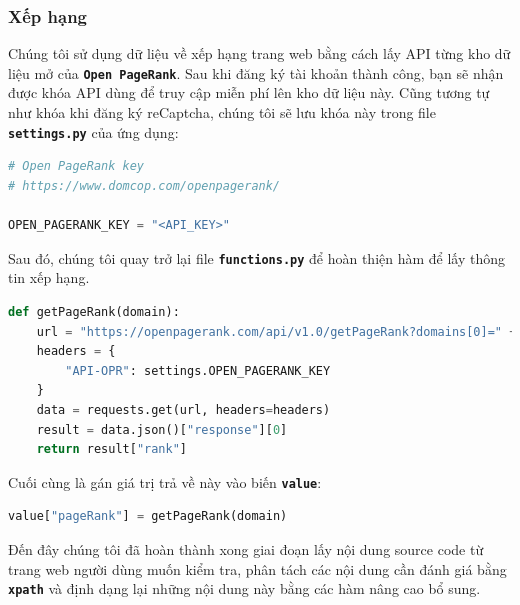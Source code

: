 \subsubsection{Xếp hạng}
Chúng tôi sử dụng dữ liệu về xếp hạng trang web bằng cách lấy API từng kho dữ liệu mở của \textbf{\texttt{Open PageRank}}. Sau khi đăng ký tài khoản thành công, bạn sẽ nhận được khóa API dùng để truy cập miễn phí lên kho dữ liệu này. Cũng tương tự như khóa khi đăng ký reCaptcha, chúng tôi sẽ lưu khóa này trong file \textbf{\texttt{settings.py}} của ứng dụng:
\begin{lstlisting}[language=Python]
# Open PageRank key
# https://www.domcop.com/openpagerank/

OPEN_PAGERANK_KEY = "<API_KEY>"
\end{lstlisting}
\par
Sau đó, chúng tôi quay trở lại file \textbf{\texttt{functions.py}} để hoàn thiện hàm để lấy thông tin xếp hạng.
\begin{lstlisting}[language=Python]
def getPageRank(domain):
    url = "https://openpagerank.com/api/v1.0/getPageRank?domains[0]=" + domain
    headers = {
        "API-OPR": settings.OPEN_PAGERANK_KEY
    }
    data = requests.get(url, headers=headers)
    result = data.json()["response"][0]
    return result["rank"]
\end{lstlisting}
\par
Cuối cùng là gán giá trị trả về này vào biến \textbf{\texttt{value}}:
\begin{lstlisting}[language=Python]
value["pageRank"] = getPageRank(domain)
\end{lstlisting}
\par
Đến đây chúng tôi đã hoàn thành xong giai đoạn lấy nội dung source code từ trang web người dùng muốn kiểm tra, phân tách các nội dung cần đánh giá bằng \textbf{\texttt{xpath}} và định dạng lại những nội dung này bằng các hàm nâng cao bổ sung.
